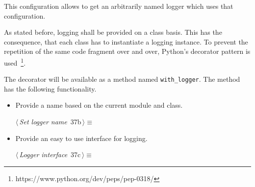 \documentclass[
    a4paper,      %
    10pt,         %
    openright,    %
    notitlepage,  %
    parskip=half, %
]{scrreprt}       %
\theoremstyle{definition}                    %
\begin{document}
This configuration allows to get an arbitrarily named logger which uses that
configuration.

As stated before, logging shall be provided on a class basis. This has the
consequence, that each class has to instantiate a logging instance. To prevent
the repetition of the same code fragment over and over, Python's decorator
pattern is used~\footnote{https://www.python.org/dev/peps/pep-0318/}.

The decorator will be available as a method named \verb+with_logger+.
The method has the following functionality.

\begin{itemize}
  \item Provide a name based on the current module and class.
    \begin{flushleft} \small
\begin{minipage}{\linewidth}\label{scrap43}\raggedright\small
{} $\langle\,${\itshape Set logger name}\nobreak\ {\footnotesize {37b}}$\,\rangle\equiv$
\vspace{-1ex}
\vspace{-1.5ex}
\footnotesize
{}
\end{minipage}\vspace{4ex}
\end{flushleft}
\item Provide an easy to use interface for logging.
    \begin{flushleft} \small
\begin{minipage}{\linewidth}\label{scrap44}\raggedright\small
{} $\langle\,${\itshape Logger interface}\nobreak\ {\footnotesize {37c}}$\,\rangle\equiv$
\vspace{-1ex}
\vspace{-1.5ex}
\footnotesize
{}
\end{minipage}
\end{flushleft}
\end{itemize}
\end{document}
